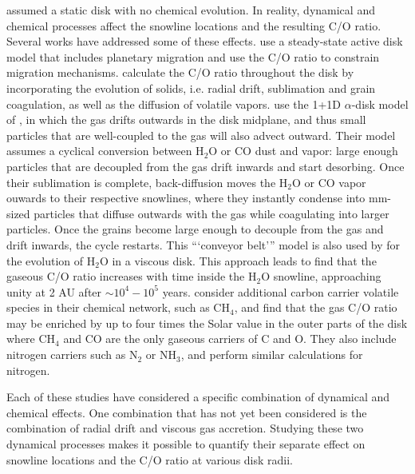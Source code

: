 \documentclass[apj]{emulateapj}
\begin{document}
\citet{oberg11} assumed a static disk with no chemical evolution. In reality, dynamical and chemical processes affect the snowline locations and the resulting C/O ratio. Several works have addressed some of these effects. \citet{madhu14} use a steady-state active disk model that includes planetary migration and use the C/O ratio to constrain migration mechanisms. \citet{alidib14} calculate the C/O ratio throughout the disk by incorporating the evolution of solids, i.e. radial drift, sublimation and grain coagulation, as well as the diffusion of volatile vapors. \citet{alidib14} use the 1+1D $\alpha$-disk model of \citet{hughes10}, in which the gas drifts outwards in the disk midplane, and thus small particles that are well-coupled to the gas will also advect outward. Their model assumes a cyclical conversion between H$_2$O or CO dust and vapor: large enough particles that are decoupled from the gas drift inwards and start desorbing. Once their sublimation is complete, back-diffusion moves the H$_2$O or CO vapor ouwards to their respective snowlines, where they instantly condense into mm-sized particles that diffuse outwards with the gas while coagulating into larger particles. Once the grains become large enough to decouple from the gas and drift inwards, the cycle restarts. This ```conveyor belt''' model is also used by \citet{ciesla06} for the evolution of H$_2$O in a viscous disk. This approach leads \citet{alidib14} to find that the gaseous C/O ratio increases with time inside the H$_2$O snowline, approaching unity at 2 AU after $\sim$$10^4-10^5$ years.  \citet{thiabaud15} consider additional carbon carrier volatile species in their chemical network, such as CH$_4$, and find that the gas C/O ratio may be enriched by up to four times the Solar value in the outer parts of the disk where CH$_4$ and CO are the only gaseous carriers of C and O.  They also include nitrogen carriers such as N$_2$ or NH$_3$, and perform similar calculations for nitrogen. 

Each of these studies have considered a specific combination of dynamical and chemical effects. One combination that has not yet been considered is the combination of radial drift and viscous gas accretion. Studying these two dynamical processes makes it possible to quantify their separate effect on snowline locations and the C/O ratio at various disk radii.
\end{document}
